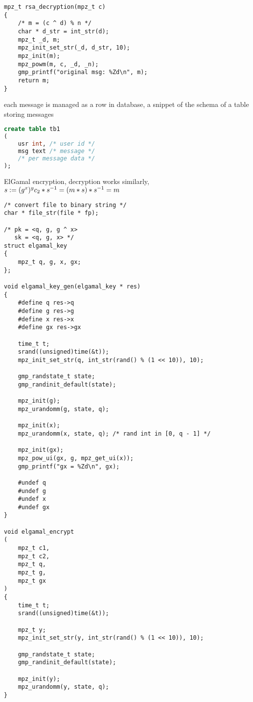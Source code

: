 \documentclass[12pt, border = 4pt, multi]{article} %
\begin{document}
\begin{multicols}{2}
\begin{lstlisting}[morekeywords = {mpz_t}]
mpz_t rsa_decryption(mpz_t c)
{
	/* m = (c ^ d) % n */
	char * d_str = int_str(d);
	mpz_t _d, m;
	mpz_init_set_str(_d, d_str, 10);
	mpz_init(m);
	mpz_powm(m, c, _d, _n);
	gmp_printf("original msg: %Zd\n", m);
	return m;
}
\end{lstlisting}
each message is managed as a row in database, a snippet of the schema of a table storing messages
\begin{lstlisting}[language = sql]
create table tb1
(
	usr int, /* user id */
	msg text /* message */
	/* per message data */
);
\end{lstlisting}
ElGamal encryption, decryption works similarly, $s := (g ^ x) ^ y\\
c_2 * s^{-1} = (m * s) * s^{-1} = m$
\begin{lstlisting}[morekeywords = {mpz_t, time_t, define, undef}]
/* convert file to binary string */
char * file_str(file * fp); 

/* pk = <q, g, g ^ x> 
   sk = <q, g, x> */
struct elgamal_key
{
	mpz_t q, g, x, gx;
};

void elgamal_key_gen(elgamal_key * res)
{
	#define q res->q
	#define g res->g
	#define x res->x
	#define gx res->gx

	time_t t;
	srand((unsigned)time(&t)); 
	mpz_init_set_str(q, int_str(rand() % (1 << 10)), 10);

	gmp_randstate_t state;
	gmp_randinit_default(state);

	mpz_init(g);
	mpz_urandomm(g, state, q);

	mpz_init(x);
	mpz_urandomm(x, state, q); /* rand int in [0, q - 1] */

	mpz_init(gx);
	mpz_pow_ui(gx, g, mpz_get_ui(x));
	gmp_printf("gx = %Zd\n", gx);

	#undef q
	#undef g
	#undef x
	#undef gx
}

void elgamal_encrypt
(
	mpz_t c1,
	mpz_t c2,
	mpz_t q,
	mpz_t g,
	mpz_t gx
)
{
	time_t t;
	srand((unsigned)time(&t)); 
	
	mpz_t y;
	mpz_init_set_str(y, int_str(rand() % (1 << 10)), 10);

	gmp_randstate_t state;
	gmp_randinit_default(state);

	mpz_init(y);
	mpz_urandomm(y, state, q);
}


\end{lstlisting}
\end{multicols}
\end{document}
